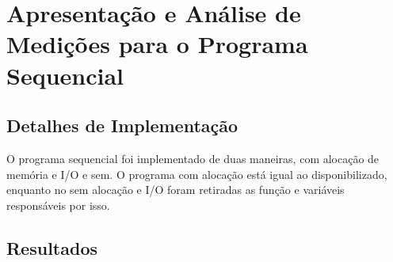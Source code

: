 \documentclass[final,12pt,a4paper]{elsarticle}
\begin{document}

\section{Apresentação e Análise de Medições para o Programa Sequencial}

\subsection{Detalhes de Implementação}

O programa sequencial foi implementado de duas maneiras, com alocação de memória e I/O e sem. O programa com alocação está igual ao disponibilizado, enquanto no sem alocação e I/O foram retiradas as função e variáveis responsáveis por isso.

\subsection{Resultados}
\end{document}
